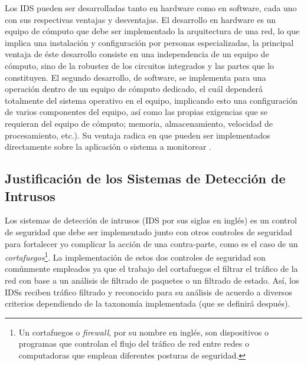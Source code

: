 Los IDS pueden ser desarrolladas tanto en hardware como en software, cada uno con sus respectivas ventajas y desventajas. El desarrollo en hardware es un equipo de cómputo que debe ser implementado la arquitectura de una red, lo que implica una instalación y configuración por personas especializadas, la principal ventaja de éste desarrollo consiste en una independencia de un equipo de cómputo, sino de la robustez de los circuitos integrados y las partes que lo constituyen. El segundo desarrollo, de software, se implementa para una operación dentro de un equipo de cómputo dedicado, el cuál dependerá totalmente del sistema operativo en el equipo, implicando esto una configuración de varios componentes del equipo, así como las propias exigencias que se requieran del equipo de cómputo; memoria, almacenamiento, velocidad de procesamiento, etc.). Su ventaja radica en que pueden ser implementados directamente sobre la aplicación o sistema a monitorear \cite{dieciseis}. \\

\subsection{Justificación de los Sistemas de Detección de Intrusos}

Los sistemas de detección de intrusos (IDS por sus siglas en inglés) es un control de seguridad que debe ser implementado junto con otros controles de seguridad para fortalecer y\/o complicar la acción de una contra-parte, como es el caso de un \textit{cortafuegos}\footnote{Un cortafuegos o \textit{firewall}, por su nombre en inglés, son dispositivos o programas que controlan el flujo del tráfico de red entre redes o computadoras que emplean diferentes posturas de seguridad\cite{nist41}.}. La implementación de estos dos controles de seguridad son comúnmente empleados ya que el trabajo del cortafuegos el filtrar el tráfico de la red con base a un análisis de filtrado de paquetes o un filtrado de estado. Así, los IDSs reciben tráfico filtrado y reconocido para su análisis de acuerdo a diversos criterios dependiendo de la taxonomía implementada (que se definirá después). \\

